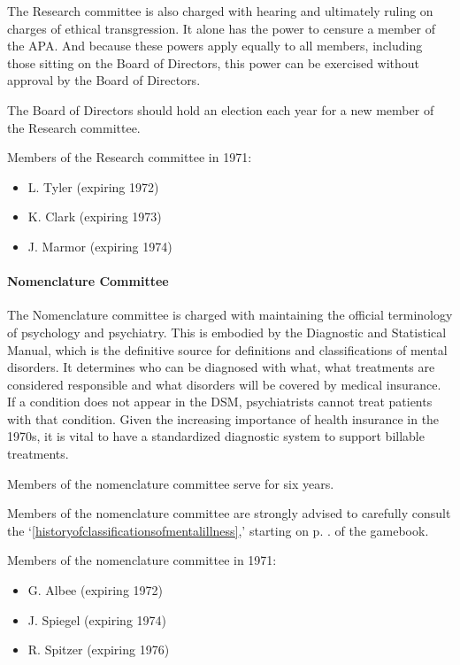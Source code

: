 The Research committee is also charged with hearing and ultimately ruling on charges of ethical transgression. It alone has the power to censure a member of the APA. And because these powers apply equally to all members, including those sitting on the Board of Directors, this power can be exercised without approval by the Board of Directors.

The Board of Directors should hold an election each year for a new member of the Research committee. 

Members of the Research committee in 1971:

\begin{itemize}
\item L. Tyler (expiring 1972)

\item K. Clark (expiring 1973)

\item J. Marmor (expiring 1974)

\end{itemize}

\paragraph{Nomenclature Committee}
\label{nomenclaturecommittee}

The Nomenclature committee is charged with maintaining the official terminology of psychology and psychiatry. This is embodied by the Diagnostic and Statistical Manual, which is the definitive source for definitions and classifications of mental disorders. It determines who can be diagnosed with what, what treatments are considered responsible and what disorders will be covered by medical insurance. If a condition does not appear in the DSM, psychiatrists cannot treat patients with that condition. Given the increasing importance of health insurance in the 1970s, it is vital to have a standardized diagnostic system to support billable treatments.

Members of the nomenclature committee serve for six years.

Members of the nomenclature committee are strongly advised to carefully consult the ‘\ref{historyofclassificationsofmentalillness},’ starting on p. \pageref{historyofclassificationsofmentalillness}. of the gamebook.

Members of the nomenclature committee in 1971:

\begin{itemize}
\item G. Albee (expiring 1972)

\item J. Spiegel (expiring 1974)

\item R. Spitzer (expiring 1976)

\end{itemize}

